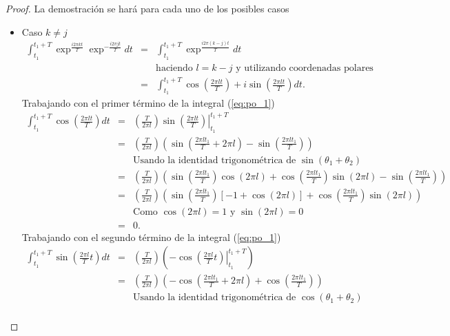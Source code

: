 \documentclass{article}
\begin{document}
\begin{proof}
La demostraci\'on se har\'a para cada uno de los posibles casos
\begin{itemize}
\item Caso $k\neq j$
\begin{eqnarray}
\int_{t_1}^{t_1+T}\exp^{\frac{i2\pi kt}{T}}\exp^{-\frac{i2\pi jt}{T}}dt&=&\int_{t_1}^{t_1+T}\exp^{\frac{i2\pi(k-j)t}{T}}dt \nonumber \\
&& \textrm{haciendo $l=k-j$ y utilizando coordenadas polares} \nonumber \\
&=& \int_{t_1}^{t_1+T}\cos\left(\frac{2\pi lt}{T}\right)+i\sin\left(\frac{2\pi lt}{T}\right)dt. \label{eq:po_1}
\end{eqnarray}
Trabajando con el primer t\'ermino de la integral (\ref{eq:po_1})
\begin{eqnarray}
\int_{t_1}^{t_1+T}\cos\left(\frac{2\pi lt}{T}\right)dt&=&\left(\frac{T}{2\pi l}\right)\sin\left.\left(\frac{2\pi lt}{T}\right)\right|_{t_1}^{t_1+T} \nonumber \\
&=&\left(\frac{T}{2\pi l}\right)\left(\sin\left(\frac{2\pi l t_1}{T}+2\pi l\right)-\sin\left(\frac{2\pi lt_1}{T}\right)\right) \nonumber \\
&&\textrm{Usando la identidad trigonom\'etrica de }\sin(\theta_1+\theta_2) \nonumber \\
&=&\left(\frac{T}{2\pi l}\right)\left(\sin\left(\frac{2\pi l t_1}{T}\right)\cos(2\pi l)+\cos\left(\frac{2\pi lt_1}{T}\right)\sin(2\pi l)-\sin\left(\frac{2\pi lt_1}{T}\right)\right) \nonumber \\
&=&\left(\frac{T}{2\pi l}\right)\left(\sin\left(\frac{2\pi lt_1}{T}\right)\left[-1+\cos(2\pi l)\right]+\cos\left(\frac{2\pi lt_1}{T}\right)\sin(2\pi l)\right) \nonumber \\
&&\textrm{Como }\cos(2\pi l)=1 \textrm{ y }\sin(2\pi l)=0 \nonumber \\
&=&0. \nonumber
\end{eqnarray}
Trabajando con el segundo término de la integral (\ref{eq:po_1})
\begin{eqnarray}
\int_{t_1}^{t_1+T}\sin\left(\frac{2\pi l}{T}t\right)dt&=&\left(\frac{T}{2\pi l}\right)\left(-\left.\cos\left(\frac{2\pi l}{T}t\right)\right|_{t_1}^{t_1+T}\right) \nonumber \\
&=&\left(\frac{T}{2\pi l}\right)\left(-\cos\left(\frac{2\pi lt_1}{T}+2\pi l\right)+\cos\left(\frac{2\pi lt_1}{T}\right)\right) \nonumber \\
&&\textrm{Usando la identidad trigonom\'etrica de }\cos(\theta_1+\theta_2) \nonumber \\

\end{eqnarray}
\end{itemize}
\end{proof}
\end{document}
